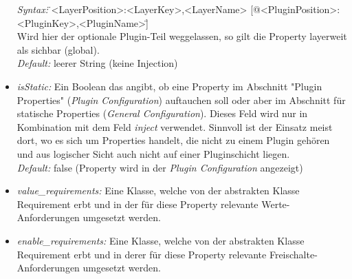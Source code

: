 \documentclass[a4paper, 11pt]{article} %
\begin{document}
\begin{itemize}
	\emph{Syntax:} \"{}<LayerPosition>:<LayerKey>,<LayerName> [@<PluginPosition>:<PluginKey>,<PluginName>]\"{}\\
	Wird hier der optionale Plugin-Teil weggelassen, so gilt die Property layerweit als sichbar (global).\\
	\emph{Default:} leerer String (keine Injection)
	\item \emph{isStatic:} Ein Boolean das angibt, ob eine Property im Abschnitt "Plugin Properties" (\emph{Plugin Configuration}) auftauchen soll oder aber im Abschnitt für statische Properties (\emph{General Configuration}). Dieses Feld wird nur in Kombination mit dem Feld \emph{inject} verwendet. Sinnvoll ist der Einsatz meist dort, wo es sich um Properties handelt, die nicht zu einem Plugin gehören und aus logischer Sicht auch nicht auf einer Pluginschicht liegen.\\
	\emph{Default:} false (Property wird in der \emph{Plugin Configuration} angezeigt)
	\item \emph{value\_requirements:} Eine Klasse, welche von der abstrakten Klasse Requirement erbt und in der für diese Property relevante Werte-Anforderungen umgesetzt werden.
	\item \emph{enable\_requirements:} Eine Klasse, welche von der abstrakten Klasse Requirement erbt und in derer für diese Property relevante Freischalte-Anforderungen umgesetzt werden.
\end{itemize}
\end{document}
